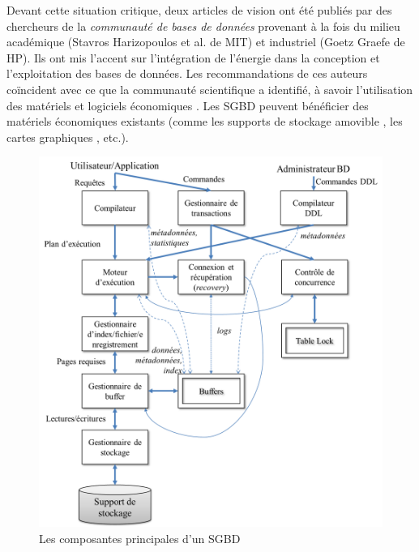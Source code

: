 Devant cette situation critique, deux articles de vision ont été publiés par des chercheurs de la \textit{communauté de bases de données} provenant à la fois du milieu académique (Stavros Harizopoulos et al. \cite{Harizopoulos09} de MIT) et industriel (Goetz Graefe \cite{Graefe08} de HP). Ils ont mis l'accent sur l'intégration de l'énergie dans la conception et l'exploitation des bases de données. Les recommandations de ces auteurs coïncident avec ce que la communauté scientifique a identifié, à savoir l'utilisation des matériels et logiciels économiques \cite{PoessN08}. Les SGBD peuvent bénéficier des matériels économiques existants (comme les supports de stockage amovible \cite{Schall10}, les cartes graphiques \cite{Hurson16}, etc.).  

\begin{figure}
	\begin{center}
		\includegraphics[scale=0.5]{chapitre1/chap1Fig/composantesSGBD.png}
		\caption{Les composantes principales d'un SGBD}
		\label{fig:composantesSGBD}
	\end{center}
\end{figure}

